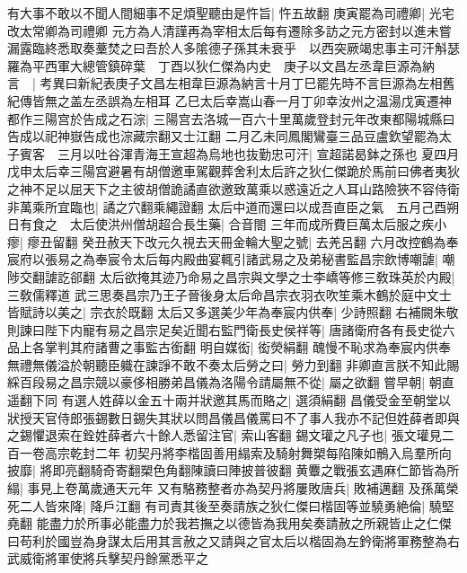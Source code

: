 有大事不敢以不聞人間細事不足煩聖聽由是忤旨|{
	忤五故翻}
庚寅罷為司禮卿|{
	光宅改太常卿為司禮卿}
元方為人清謹再為宰相太后每有遷除多訪之元方密封以進未嘗漏露臨終悉取奏藳焚之曰吾於人多隂德子孫其未衰乎　以西突厥竭忠事主可汗斛瑟羅為平西軍大總管鎮碎葉　丁酉以狄仁傑為内史　庚子以文昌左丞韋巨源為納言　|{
	考異曰新紀表庚子文昌左相韋巨源為納言十月丁巳罷先時不言巨源為左相舊紀傳皆無之盖左丞誤為左相耳}
乙巳太后幸嵩山春一月丁卯幸汝州之温湯戊寅遷神都作三陽宫於告成之石淙|{
	三陽宫去洛城一百六十里萬歲登封元年改東都陽城縣曰告成以祀神嶽告成也淙藏宗翻又士江翻}
二月乙未同鳳閣鸞臺三品豆盧欽望罷為太子賓客　三月以吐谷渾青海王宣超為烏地也抜勤忠可汗|{
	宣超諾曷鉢之孫也}
夏四月戊申太后幸三陽宫避暑有胡僧邀車駕觀葬舍利太后許之狄仁傑跪於馬前曰佛者夷狄之神不足以屈天下之主彼胡僧詭譎直欲邀致萬乘以惑遠近之人耳山路險狹不容侍衛非萬乘所宜臨也|{
	譎之穴翻乘繩證翻}
太后中道而還曰以成吾直臣之氣　五月己酉朔日有食之　太后使洪州僧胡超合長生藥|{
	合音閤}
三年而成所費巨萬太后服之疾小瘳|{
	瘳丑留翻}
癸丑赦天下改元久視去天冊金輪大聖之號|{
	去羌呂翻}
六月改控鶴為奉宸府以張易之為奉宸令太后每内殿曲宴輒引諸武易之及弟秘書監昌宗飲博嘲謔|{
	嘲陟交翻謔訖郤翻}
太后欲掩其迹乃命易之昌宗與文學之士李嶠等修三敎珠英於内殿|{
	三敎儒釋道}
武三思奏昌宗乃王子晉後身太后命昌宗衣羽衣吹笙乘木鶴於庭中文士皆賦詩以美之|{
	宗衣於既翻}
太后又多選美少年為奉宸内供奉|{
	少詩照翻}
右補闕朱敬則諫曰陛下内寵有易之昌宗足矣近聞右監門衛長史侯祥等|{
	唐諸衛府各有長史從六品上各掌判其府諸曹之事監古銜翻}
明自媒衒|{
	衒熒絹翻}
醜慢不恥求為奉宸内供奉無禮無儀溢於朝聽臣軄在諫諍不敢不奏太后勞之曰|{
	勞力到翻}
非卿直言朕不知此賜綵百段易之昌宗競以豪侈相勝弟昌儀為洛陽令請屬無不從|{
	屬之欲翻}
嘗早朝|{
	朝直遥翻下同}
有選人姓薛以金五十兩并狀邀其馬而賂之|{
	選須絹翻}
昌儀受金至朝堂以狀授天官侍郎張錫數日錫失其狀以問昌儀昌儀罵曰不了事人我亦不記但姓薛者即與之錫懼退索在銓姓薛者六十餘人悉留注官|{
	索山客翻}
錫文瓘之凡子也|{
	張文瓘見二百一卷高宗乾封二年}
初契丹將李楷固善用䌈索及騎射舞槊每陷陳如鶻入烏羣所向披靡|{
	將即亮翻騎奇寄翻槊色角翻陳讀曰陣披普彼翻}
黄麞之戰張玄遇麻仁節皆為所䌈|{
	事見上卷萬歲通天元年}
又有駱務整者亦為契丹將屢敗唐兵|{
	敗補邁翻}
及孫萬榮死二人皆來降|{
	降戶江翻}
有司責其後至奏請族之狄仁傑曰楷固等並驍勇絶倫|{
	驍堅堯翻}
能盡力於所事必能盡力於我若撫之以德皆為我用矣奏請赦之所親皆止之仁傑曰苟利於國豈為身謀太后用其言赦之又請與之官太后以楷固為左鈐衛將軍務整為右武威衛將軍使將兵擊契丹餘黨悉平之


